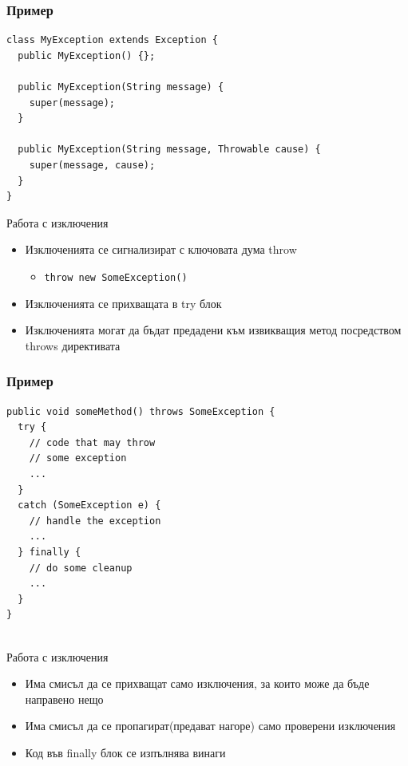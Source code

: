 \documentclass{beamer}
\begin{document}
\begin{frame}[fragile]
  \frametitle{Пример}
  \transdissolve
\begin{lstlisting}
class MyException extends Exception {
  public MyException() {};

  public MyException(String message) {
    super(message);    
  }
  
  public MyException(String message, Throwable cause) {
    super(message, cause);  
  }
}    
\end{lstlisting}
\end{frame}

\begin{frame}{Работа с изключения}
  \transdissolve
  \begin{itemize}
  \item Изключенията се сигнализират с ключовата дума throw
    \begin{itemize}
      \item \lstinline$throw new SomeException()$ \pause
    \end{itemize}
  \item Изключенията се прихващата в try блок \pause
  \item Изключенията могат да бъдат предадени към извикващия метод
    посредством throws директивата
  \end{itemize}
\end{frame}

\begin{frame}[fragile]
  \frametitle{Пример}
  \transdissolve
\begin{lstlisting}
public void someMethod() throws SomeException {
  try {
    // code that may throw
    // some exception
    ... 
  }
  catch (SomeException e) {
    // handle the exception
    ...
  } finally {
    // do some cleanup
    ...
  }
}
  
\end{lstlisting}
\end{frame}

\begin{frame}{Работа с изключения}
  \transdissolve
  \begin{itemize}
  \item Има смисъл да се прихващат само изключения, за които може да
    бъде направено нещо \pause
  \item Има смисъл да се пропагират(предават нагоре) само проверени изключения \pause
  \item Код във finally блок се изпълнява винаги 
  \end{itemize}
\end{frame}
\end{document}
